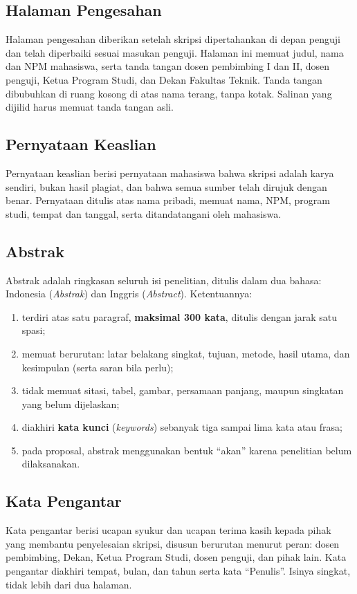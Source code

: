 \subsection{Halaman Pengesahan}
Halaman pengesahan diberikan setelah skripsi dipertahankan di depan penguji dan telah diperbaiki sesuai masukan penguji. Halaman ini memuat judul, nama dan NPM mahasiswa, serta tanda tangan dosen pembimbing I dan II, dosen penguji, Ketua Program Studi, dan Dekan Fakultas Teknik. Tanda tangan dibubuhkan di ruang kosong di atas nama terang, tanpa kotak. Salinan yang dijilid harus memuat tanda tangan asli.

\subsection{Pernyataan Keaslian}
Pernyataan keaslian berisi pernyataan mahasiswa bahwa skripsi adalah karya sendiri, bukan hasil plagiat, dan bahwa semua sumber telah dirujuk dengan benar. Pernyataan ditulis atas nama pribadi, memuat nama, NPM, program studi, tempat dan tanggal, serta ditandatangani oleh mahasiswa.

\subsection{Abstrak}
Abstrak adalah ringkasan seluruh isi penelitian, ditulis dalam dua bahasa: Indonesia (\textit{Abstrak}) dan Inggris (\textit{Abstract}). Ketentuannya:
\begin{enumerate}
\item terdiri atas satu paragraf, \textbf{maksimal 300 kata}, ditulis dengan jarak satu spasi;
\item memuat berurutan: latar belakang singkat, tujuan, metode, hasil utama, dan kesimpulan (serta saran bila perlu);
\item tidak memuat sitasi, tabel, gambar, persamaan panjang, maupun singkatan yang belum dijelaskan;
\item diakhiri \textbf{kata kunci} (\textit{keywords}) sebanyak tiga sampai lima kata atau frasa;
\item pada proposal, abstrak menggunakan bentuk “akan” karena penelitian belum dilaksanakan.
\end{enumerate}

\subsection{Kata Pengantar}
Kata pengantar berisi ucapan syukur dan ucapan terima kasih kepada pihak yang membantu penyelesaian skripsi, disusun berurutan menurut peran: dosen pembimbing, Dekan, Ketua Program Studi, dosen penguji, dan pihak lain. Kata pengantar diakhiri tempat, bulan, dan tahun serta kata “Penulis”. Isinya singkat, tidak lebih dari dua halaman.

